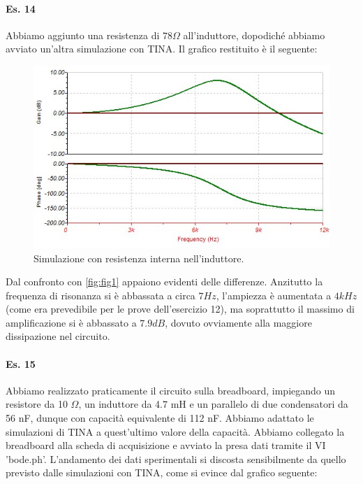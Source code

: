 \documentclass[journal, a4paper]{IEEEtran}
\begin{document}
\paragraph{Es. 14}

Abbiamo aggiunto una resistenza di $78 \Omega$ all'induttore, dopodiché abbiamo avviato un'altra simulazione con \textsc{TINA}. Il grafico restituito è il seguente:
\begin{figure}[htbp]
\centering
\includegraphics[scale=.4]{tinadiagresint}
\caption{Simulazione con resistenza interna nell'induttore.}
\end{figure}

Dal confronto con \ref{fig:fig1} appaiono evidenti delle differenze. Anzitutto la frequenza di risonanza si è abbassata a circa $7 Hz$, l'ampiezza è aumentata a $4 \si{kHz}$ (come era prevedibile per le prove dell'esercizio 12), ma soprattutto il massimo di amplificazione si è abbassato a $7.9 \si{dB}$, dovuto ovviamente alla maggiore dissipazione nel circuito.

\paragraph{Es. 15}
Abbiamo realizzato praticamente il circuito sulla breadboard, impiegando un resistore da 10 $\Omega$, un induttore da 4.7 mH e un parallelo di due condensatori da 56 nF, dunque con capacità equivalente di 112 nF. Abbiamo adattato le simulazioni di TINA a quest'ultimo valore della capacità. Abbiamo collegato la breadboard alla scheda di acquisizione e avviato la presa dati tramite il VI 'bode.ph'. L'andamento dei dati sperimentali si discosta sensibilmente da quello previsto dalle simulazioni con TINA, come si evince dal grafico seguente:
\end{document}
